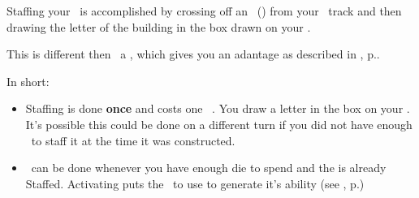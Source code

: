 Staffing your \fortifications\ is accomplished by crossing off an \astronaut\ (\useastronautsymbol) from your \population\ track and then drawing the letter of the building in the box drawn on your \planetsheet.

This is different then \activating\ a \fortification, which gives you an adantage as described in , p.\pageref{sec:fortifications}.

In short:
\begin{itemize}
  \item Staffing is done \textbf{once} and costs one \astronaut\ \useastronautsymbol.  You draw a letter in the box on your \planetsheet.  It's possible this could be done on a different turn if you did not have enough \astronauts\ to staff it at the time it was constructed.
  \item \activating\ can be done whenever you have enough die to spend and the \fortification is already Staffed.  Activating puts the \fortification\ to use to generate it's ability (see , p.\pageref{sec:activating})
\end{itemize}
